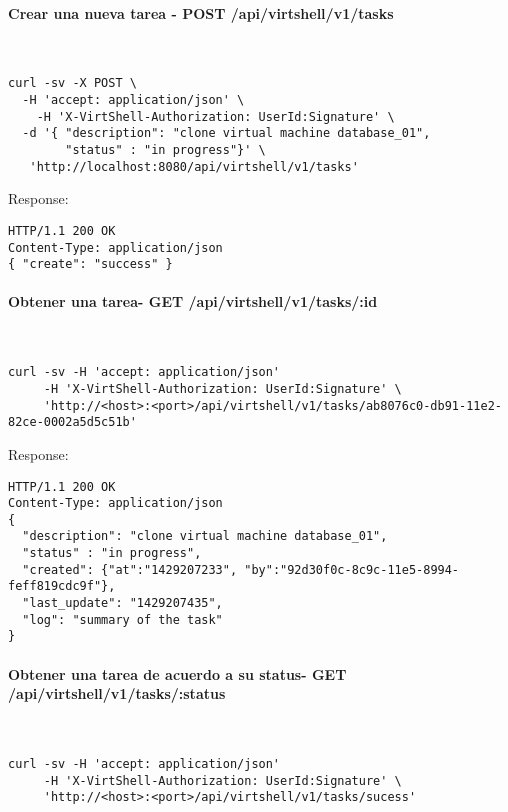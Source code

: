 \paragraph{Crear una nueva tarea - POST /api/virtshell/v1/tasks} ~\\

\begin{lstlisting}[style=json]
curl -sv -X POST \
  -H 'accept: application/json' \
    -H 'X-VirtShell-Authorization: UserId:Signature' \
  -d '{ "description": "clone virtual machine database_01",
        "status" : "in progress"}' \
   'http://localhost:8080/api/virtshell/v1/tasks'
\end{lstlisting}

Response:

\begin{lstlisting}[style=json]
HTTP/1.1 200 OK
Content-Type: application/json
{ "create": "success" }
\end{lstlisting}

\paragraph{Obtener una tarea- GET /api/virtshell/v1/tasks/:id} ~\\

\begin{lstlisting}[style=json]
curl -sv -H 'accept: application/json' 
     -H 'X-VirtShell-Authorization: UserId:Signature' \ 
     'http://<host>:<port>/api/virtshell/v1/tasks/ab8076c0-db91-11e2-82ce-0002a5d5c51b'
\end{lstlisting}

Response:

\begin{lstlisting}[style=json]
HTTP/1.1 200 OK
Content-Type: application/json
{
  "description": "clone virtual machine database_01",
  "status" : "in progress",
  "created": {"at":"1429207233", "by":"92d30f0c-8c9c-11e5-8994-feff819cdc9f"},
  "last_update": "1429207435",
  "log": "summary of the task"
}
\end{lstlisting}

\paragraph{Obtener una tarea de acuerdo a su status- GET /api/virtshell/v1/tasks/:status} ~\\

\begin{lstlisting}[style=json]
curl -sv -H 'accept: application/json' 
     -H 'X-VirtShell-Authorization: UserId:Signature' \ 
     'http://<host>:<port>/api/virtshell/v1/tasks/sucess'
\end{lstlisting}

